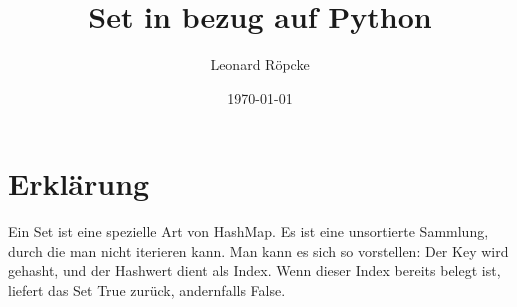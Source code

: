 \documentclass[12pt,a4paper]{article}
\title{Set in bezug auf Python}
\author{Leonard Röpcke}
\date{\today}
\begin{document}
\maketitle

\section{Erklärung}
Ein Set ist eine spezielle Art von HashMap. Es ist eine unsortierte Sammlung, durch die man nicht iterieren kann.
Man kann es sich so vorstellen: Der Key wird gehasht, und der Hashwert dient als Index.
Wenn dieser Index bereits belegt ist, liefert das Set True zurück, andernfalls False.
\end{document}
